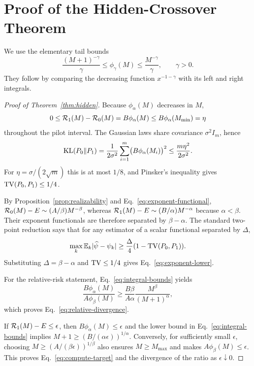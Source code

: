 \section{Proof of the Hidden-Crossover Theorem}

We use the elementary tail bounds
\begin{equation}
 \frac{(M+1)^{-\gamma}}{\gamma}
 \le \phi_\gamma(M)
 \le \frac{M^{-\gamma}}{\gamma},
 \qquad \gamma>0.
 \label{eq:integral-bounds}
\end{equation}
They follow by comparing the decreasing function $x^{-1-\gamma}$ with its left and right integrals.

\begin{proof}[Proof of Theorem~\ref{thm:hidden}]
Because $\phi_\alpha(M)$ decreases in $M$,
\[
0\le\mathcal{R}_1(M)-\mathcal{R}_0(M)=B\phi_\alpha(M)
\le B\phi_\alpha(M_{\min})=\eta
\]
throughout the pilot interval. The Gaussian laws share covariance $\sigma^2I_m$, hence
\[
\mathrm{KL}(P_0\|P_1)
=\frac{1}{2\sigma^2}\sum_{i=1}^m
\bigl(B\phi_\alpha(M_i)\bigr)^2
\le\frac{m\eta^2}{2\sigma^2}.
\]
For $\eta=\sigma/(2\sqrt m)$ this is at most $1/8$, and Pinsker's inequality gives $\mathrm{TV}(P_0,P_1)\le1/4$.

By Proposition~\ref{prop:realizability} and Eq.~\eqref{eq:exponent-functional},
$\mathcal{R}_0(M)-E\sim(A/\beta)M^{-\beta}$, whereas
$\mathcal{R}_1(M)-E\sim(B/\alpha)M^{-\alpha}$ because $\alpha<\beta$. Their exponent functionals are therefore separated by $\beta-\alpha$. The standard two-point reduction says that for any estimator of a scalar functional separated by $\Delta$,
\[
\max_k\mathbb{E}_k|\widehat\psi-\psi_k|
\ge\frac{\Delta}{4}(1-\mathrm{TV}(P_0,P_1)).
\]
Substituting $\Delta=\beta-\alpha$ and $\mathrm{TV}\le1/4$ gives Eq.~\eqref{eq:exponent-lower}.

For the relative-risk statement, Eq.~\eqref{eq:integral-bounds} yields
\[
\frac{B\phi_\alpha(M)}{A\phi_\beta(M)}
\ge\frac{B\beta}{A\alpha}\frac{M^\beta}{(M+1)^\alpha},
\]
which proves Eq.~\eqref{eq:relative-divergence}.

If $\mathcal{R}_1(M)-E\le\epsilon$, then $B\phi_\alpha(M)\le\epsilon$ and the lower bound in Eq.~\eqref{eq:integral-bounds} implies
$M+1\ge(B/(\alpha\epsilon))^{1/\alpha}$. Conversely, for sufficiently small $\epsilon$, choosing
$M\ge(A/(\beta\epsilon))^{1/\beta}$ also ensures $M\ge M_{\max}$ and makes $A\phi_\beta(M)\le\epsilon$. This proves Eq.~\eqref{eq:compute-target} and the divergence of the ratio as $\epsilon\downarrow0$.
\end{proof}


